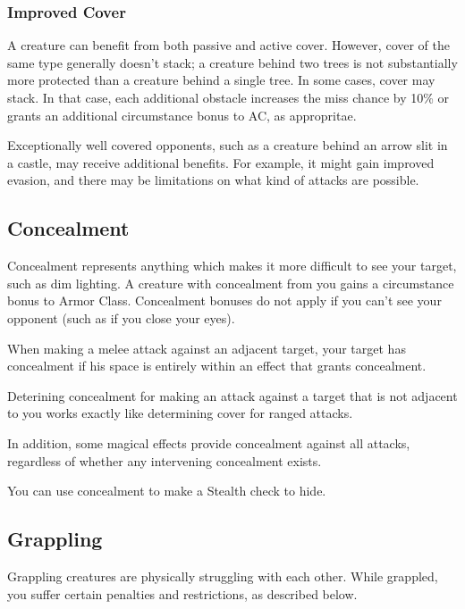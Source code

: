 \subsubsection{Improved Cover}

A creature can benefit from both passive and active cover. However, cover of the same type generally doesn't stack; a creature behind two trees is not substantially more protected than a creature behind a single tree. In some cases, cover may stack. In that case, each additional obstacle increases the miss chance by 10\% or grants an additional  circumstance bonus to AC, as appropritae.

Exceptionally well covered opponents, such as a creature behind an arrow slit in a castle, may receive additional benefits. For example, it might gain improved evasion, and there may be limitations on what kind of attacks are possible.

\subsection{Concealment}\label{Concealment}
Concealment represents anything which makes it more difficult to see your target, such as dim lighting. A creature with concealment from you gains a  circumstance bonus to Armor Class. Concealment bonuses do not apply if you can't see your opponent (such as if you close your eyes).

 When making a melee attack against an adjacent target, your target has concealment if his space is entirely within an effect that grants concealment.

Deterining concealment for making an attack against a target that is not adjacent to you works exactly like determining cover for ranged attacks.

In addition, some magical effects provide concealment against all attacks, regardless of whether any intervening concealment exists.

 You can use concealment to make a Stealth check to hide.

\subsection{Grappling}
Grappling creatures are physically struggling with each other. While grappled, you suffer certain penalties and restrictions, as described below. 

